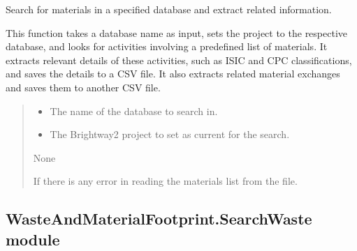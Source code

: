 \documentclass[letterpaper,10pt,english]{sphinxmanual}
\begin{document}
\begin{fulllineitems}
\label{\detokenize{WasteAndMaterialFootprint:WasteAndMaterialFootprint.SearchMaterial.SearchMaterial}}
\pysigstartsignatures
{}
\pysigstopsignatures
\sphinxAtStartPar
Search for materials in a specified database and extract related information.

\sphinxAtStartPar
This function takes a database name as input, sets the project to the respective database,
and looks for activities involving a predefined list of materials. It extracts relevant details
of these activities, such as ISIC and CPC classifications, and saves the details to a CSV file.
It also extracts related material exchanges and saves them to another CSV file.
\begin{quote}\begin{description}
\begin{itemize}
\item {} 
\sphinxAtStartPar
{} \textendash{} The name of the database to search in.

\item {} 
\sphinxAtStartPar
{} \textendash{} The Brightway2 project to set as current for the search.

\end{itemize}

\sphinxAtStartPar
None

\sphinxAtStartPar
{} \textendash{} If there is any error in reading the materials list from the file.

\end{description}\end{quote}

\end{fulllineitems}



\subsection{WasteAndMaterialFootprint.SearchWaste module}
\label{\detokenize{WasteAndMaterialFootprint:module-WasteAndMaterialFootprint.SearchWaste}}\label{\detokenize{WasteAndMaterialFootprint:wasteandmaterialfootprint-searchwaste-module}}
\end{document}
